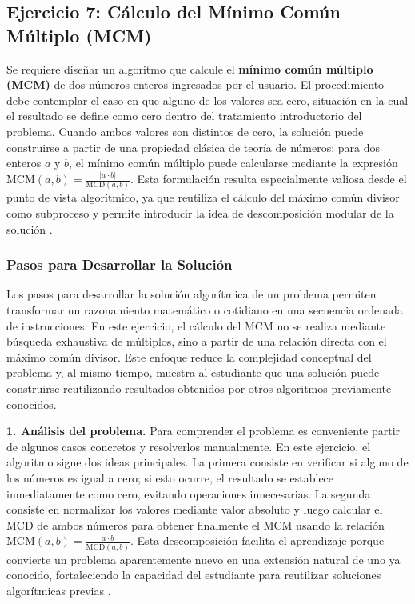 \documentclass[12pt,twoside]{book}
\begin{document}
				\subsection{Ejercicio 7: Cálculo del Mínimo Común Múltiplo (MCM)}
					\noindent
					Se requiere diseñar un algoritmo que calcule el \textbf{mínimo común múltiplo (MCM)} de dos números enteros ingresados por el usuario. El procedimiento debe contemplar el caso en que alguno de los valores sea cero, situación en la cual el resultado se define como cero dentro del tratamiento introductorio del problema. Cuando ambos valores son distintos de cero, la solución puede construirse a partir de una propiedad clásica de teoría de números: para dos enteros \(a\) y \(b\), el mínimo común múltiplo puede calcularse mediante la expresión \(\text{MCM}(a,b)=\frac{|a\cdot b|}{\text{MCD}(a,b)}\). Esta formulación resulta especialmente valiosa desde el punto de vista algorítmico, ya que reutiliza el cálculo del máximo común divisor como subproceso y permite introducir la idea de descomposición modular de la solución \cite{Cormen2022Introduction,Sebesta2018Concepts}.
					
					\subsubsection{Pasos para Desarrollar la Solución}
						Los pasos para desarrollar la solución algorítmica de un problema permiten transformar un razonamiento matemático o cotidiano en una secuencia ordenada de instrucciones. En este ejercicio, el cálculo del MCM no se realiza mediante búsqueda exhaustiva de múltiplos, sino a partir de una relación directa con el máximo común divisor. Este enfoque reduce la complejidad conceptual del problema y, al mismo tiempo, muestra al estudiante que una solución puede construirse reutilizando resultados obtenidos por otros algoritmos previamente conocidos.
						
						\noindent
						\textbf{1. Análisis del problema.}  
						Para comprender el problema es conveniente partir de algunos casos concretos y resolverlos manualmente. En este ejercicio, el algoritmo sigue dos ideas principales. La primera consiste en verificar si alguno de los números es igual a cero; si esto ocurre, el resultado se establece inmediatamente como cero, evitando operaciones innecesarias. La segunda consiste en normalizar los valores mediante valor absoluto y luego calcular el MCD de ambos números para obtener finalmente el MCM usando la relación \(\text{MCM}(a,b)=\frac{a\cdot b}{\text{MCD}(a,b)}\). Esta descomposición facilita el aprendizaje porque convierte un problema aparentemente nuevo en una extensión natural de uno ya conocido, fortaleciendo la capacidad del estudiante para reutilizar soluciones algorítmicas previas \cite{Qian2018Students,Robins2003Learning,Lister2004Learning}.
						
\end{document}
